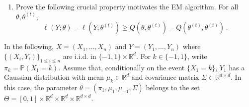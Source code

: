 \documentclass[a4paper,10pt,fleqn]{article}
\newcommand{\eqsp}{\,}
\newcommand{\rset}{\ensuremath{\mathbb{R}}}
\newcommand{\bP}{\mathbb{P}}
\newcommand{\1}{\ensuremath{\mathbbm{1}}}
\begin{document}
\begin{enumerate}
\item Prove the following crucial property motivates the EM algorithm.  For all $\theta,\theta^{(t)}$,
$$
\ell(Y;\theta) - \ell(Y;\theta^{(t)}) \geqslant Q(\theta,\theta^{(t)})-Q(\theta^{(t)},\theta^{(t)})\eqsp.
$$


%
\end{enumerate}
In the following, $X = (X_1,\ldots,X_n)$ and $Y = (Y_1,\ldots,Y_n)$ where $\{(X_i,Y_i)\}_{1\leqslant i\leqslant n}$  are i.i.d. in $\{-1,1\} \times \rset^d$. For $k\in\{-1,1\}$, write $\pi_k = \bP(X_1 = k)$. Assume that, conditionally on the event $\{X_1 = k\}$, $Y_1$ has a Gaussian distribution with mean $\mu_k \in\rset^d$ and covariance matrix $\Sigma\in \rset^{d\times d}$. In this case, the parameter $\theta=(\pi_1, \mu_1,\mu_{-1}, \Sigma)$ belongs to the set $\Theta= [0,1] \times \rset^d \times \rset^d \times \rset^{d \times d}$.
\end{document}
